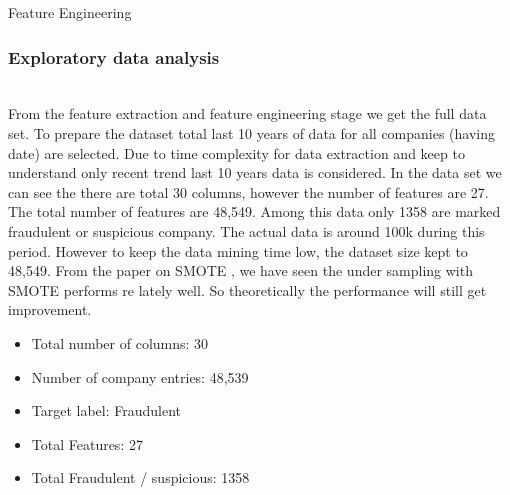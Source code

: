 \begin{algorithm}
\caption{Feature Engineering}
\label{alg:feature}

\end{algorithm}


\subsubsection{Exploratory data analysis}\hspace*{\fill} \\

From the feature extraction and feature engineering stage we get the full data set. To prepare the dataset total last 10 years of data for all companies (having  date) are selected. Due to time complexity for data extraction and keep to understand only recent trend last 10 years data is considered. In the data set we can see the there are total 30 columns, however the number of features are 27. The total number of features are 48,549. Among this data only 1358 are marked fraudulent or suspicious company. The actual data is around 100k during this period. However to keep the data mining time low, the dataset size kept to 48,549. From the paper on SMOTE \cite{}, we have seen the under sampling with SMOTE performs re lately well. So theoretically the performance will still get improvement.
\begin{itemize}
    \item Total number of columns: 30
    \item Number of company entries: 48,539
    \item Target label: Fraudulent
    \item Total Features: 27
    \item Total Fraudulent / suspicious: 1358
\end{itemize}

